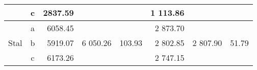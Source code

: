 \begin{table}[H]
{\begin{tabular}{|c|c|r|r|r|r|r|r|}
                                                                                                     & c        & 2837.59                                                                       &                                                                                     &                                                                                       & 1 113.86                                                                      &                                                                                     &                                                                                       \\ \hline
    \multirow{3}{*}{Stal}                                                                            & a        & 6058.45                                                                       & \multirow{3}{*}{6 050.26}                                                           & \multirow{3}{*}{103.93}                                                               & 2 873.70                                                                      & \multirow{3}{*}{2 807.90}                                                           & \multirow{3}{*}{51.79}                                                                \\ \cline{2-3} \cline{6-6}
                                                                                                     & b        & 5919.07                                                                       &                                                                                     &                                                                                       & 2 802.85                                                                      &                                                                                     &                                                                                       \\ \cline{2-3} \cline{6-6}
                                                                                                     & c        & 6173.26                                                                       &                                                                                     &                                                                                       & 2 747.15                                                                      &                                                                                     &                                                                                       \\ \hline
    \end{tabular}%
    }
    \end{table}